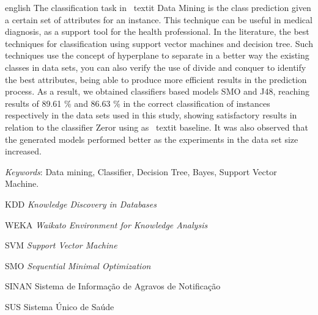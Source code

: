 \documentclass[
	12pt,				%
	openright,			%
	oneside,	
	a4paper,				%
	english,				%
	brazil				%
]{abntex2/abntex2} %
\begin{document}

\begin{resumo}[Abstract]
 \begin{otherlanguage*}{english}
   The classification task in \ textit {Data Mining} is the class prediction given a certain set of attributes for an instance. This technique can be useful in medical diagnosis, as a support tool for the health professional. In the literature, the best techniques for classification using support vector machines and decision tree. Such techniques use the concept of hyperplane to separate in a better way the existing classes in data sets, you can also verify the use of divide and conquer to identify the best attributes, being able to produce more efficient results in the prediction process. As a result, we obtained classifiers based models SMO and J48, reaching results of 89.61 \% and 86.63 \% in the correct classification of instances respectively in the data sets used in this study, showing satisfactory results in relation to the classifier Zeror using as \ textit {baseline}. It was also observed that the generated models performed better as the experiments in the data set size increased.

   \vspace{\onelineskip}
 
   \noindent 
   \textit{Keywords}: Data mining, Classifier, Decision Tree, Bayes, Support Vector Machine.
 \end{otherlanguage*}
\end{resumo}

\listoffigures*
\cleardoublepage

\listoftables*
\cleardoublepage

\begin{siglas}
  \item[KDD] \textit{Knowledge Discovery in Databases}
  \item[WEKA] \textit{Waikato Environment for Knowledge Analysis}
  \item[SVM] \textit{Support Vector Machine}
  \item[SMO] \textit{Sequential Minimal Optimization}
  \item[SINAN] Sistema de Informação de Agravos de Notificação
  \item[SUS] Sistema Único de Saúde
\end{siglas}
\end{document}
